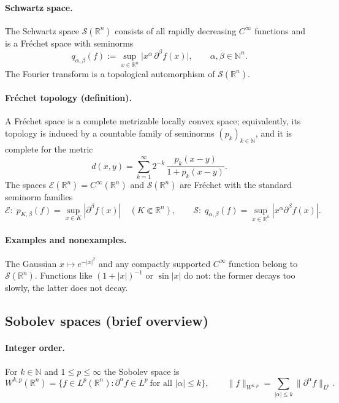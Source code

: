 \documentclass[12pt,a4paper]{article}
\theoremstyle{plain}
\theoremstyle{definition}
\theoremstyle{remark}
\theoremstyle{remark}
\begin{document}
\paragraph{Schwartz space.}
The Schwartz space $\mathcal{S}(\mathbb{R}^n)$ consists of all rapidly decreasing $C^\infty$ functions and is a Fr\'echet space with seminorms
\[
q_{\alpha,\beta}(f):=\sup_{x\in\mathbb{R}^n}\big|x^\alpha\,\partial^\beta f(x)\big|,\qquad \alpha,\beta\in\mathbb{N}^n.
\]
The Fourier transform is a topological automorphism of $\mathcal{S}(\mathbb{R}^n)$.

\paragraph{Fr\'echet topology (definition).}
A Fr\'echet space is a complete metrizable locally convex space; equivalently, its topology is induced by a countable family of seminorms $(p_k)_{k\in\mathbb{N}}$, and it is complete for the metric
\[
d(x,y)=\sum_{k=1}^\infty 2^{-k}\,\frac{p_k(x-y)}{1+p_k(x-y)}.
\]
The spaces $\mathcal{E}(\mathbb{R}^n)=C^\infty(\mathbb{R}^n)$ and $\mathcal{S}(\mathbb{R}^n)$ are Fr\'echet with the standard seminorm families
\[
\mathcal{E}:\; p_{K,\beta}(f)=\sup_{x\in K}|\partial^\beta f(x)| \quad (K\Subset\mathbb{R}^n), 
\qquad
\mathcal{S}:\; q_{\alpha,\beta}(f)=\sup_{x\in\mathbb{R}^n}|x^\alpha\partial^\beta f(x)|.
\]

\paragraph{Examples and nonexamples.}
The Gaussian $x\mapsto e^{-|x|^2}$ and any compactly supported $C^\infty$ function belong to $\mathcal{S}(\mathbb{R}^n)$. 
Functions like $(1+|x|)^{-1}$ or $\sin|x|$ do not: the former decays too slowly, the latter does not decay.

\subsection*{Sobolev spaces (brief overview)}

\paragraph{Integer order.}
For $k\in\mathbb{N}$ and $1\le p\le\infty$ the Sobolev space is
\[
W^{k,p}(\mathbb{R}^n)=\big\{f\in L^p(\mathbb{R}^n): \partial^\alpha f\in L^p \ \text{for all }|\alpha|\le k\big\},
\qquad 
\|f\|_{W^{k,p}}=\sum_{|\alpha|\le k}\|\partial^\alpha f\|_{L^p}.
\]
\end{document}
